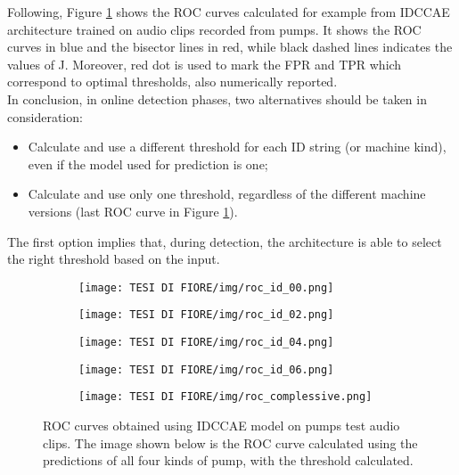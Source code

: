 Following, Figure \ref{roc_curves} shows the ROC curves calculated for example from IDCCAE architecture trained on audio clips recorded from pumps. It shows the ROC curves in blue and the bisector lines in red, while black dashed lines indicates the values of J. Moreover, red dot is used to mark the FPR and TPR which correspond to optimal thresholds, also numerically reported.\\
In conclusion, in online detection phases, two alternatives should be taken in consideration:
\begin{itemize}
    \item {Calculate and use a different threshold for each ID string (or machine kind), even if the model used for prediction is one;}
    \item {Calculate and use only one threshold, regardless of the different machine versions (last ROC curve in Figure \ref{roc_curves}).}
\end{itemize}
The first option implies that, during detection, the architecture is able to select the right threshold based on the input.\\
\begin{figure}[ht]
\centering
\begin{subfigure}
    \centering
    \texttt{[image: TESI DI FIORE/img/roc\_id\_00.png]}
\end{subfigure}
\begin{subfigure}
    \centering
    \texttt{[image: TESI DI FIORE/img/roc\_id\_02.png]}
\end{subfigure}
\begin{subfigure}
    \centering
    \texttt{[image: TESI DI FIORE/img/roc\_id\_04.png]}
\end{subfigure}
\begin{subfigure}
    \centering
    \texttt{[image: TESI DI FIORE/img/roc\_id\_06.png]}
\end{subfigure}
\begin{subfigure}
    \centering
    \texttt{[image: TESI DI FIORE/img/roc\_complessive.png]}
\end{subfigure}
\caption{ ROC curves obtained using IDCCAE model on pumps test audio clips. The image shown below is the ROC curve calculated using the predictions of all four kinds of pump, with the threshold calculated.}
\label{roc_curves}
\end{figure}